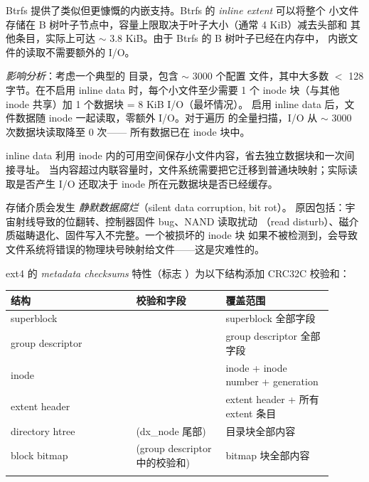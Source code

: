 \begin{filesystemlayout}
Btrfs 提供了类似但更慷慨的内嵌支持。Btrfs 的 \emph{inline extent} 可以将整个
小文件存储在 B 树叶子节点中，容量上限取决于叶子大小（通常 4 KiB）减去头部和
其他条目，实际上可达 $\sim$ 3.8 KiB。由于 Btrfs 的 B 树叶子已经在内存中，
内嵌文件的读取不需要额外的 I/O。

\emph{影响分析}：考虑一个典型的  目录，包含 $\sim$ 3000 个配置
文件，其中大多数 $<$ 128 字节。在不启用 inline data 时，每个小文件至少需要
1 个 inode 块（与其他 inode 共享）加 1 个数据块 = 8 KiB I/O（最坏情况）。
启用 inline data 后，文件数据随 inode 一起读取，零额外 I/O。对于遍历
 的全量扫描，I/O 从 $\sim$ 3000 次数据块读取降至 0 次——
所有数据已在 inode 块中。

inline data 利用 inode 内的可用空间保存小文件内容，省去独立数据块和一次间接寻址。
当内容超过内联容量时，文件系统需要把它迁移到普通块映射；实际读取是否产生 I/O
还取决于 inode 所在元数据块是否已经缓存。


存储介质会发生 \emph{静默数据腐烂}（silent data corruption, bit rot）。
原因包括：宇宙射线导致的位翻转、控制器固件 bug、NAND 读取扰动
（read disturb）、磁介质磁畴退化、固件写入不完整。一个被损坏的 inode 块
如果不被检测到，会导致文件系统将错误的物理块号映射给文件——这是灾难性的。

ext4 的 \emph{metadata checksums} 特性（标志
）为以下结构添加 CRC32C
校验和：

\begin{longtable}{|F{0.35\linewidth}|F{0.25\linewidth}|F{0.30\linewidth}|}
\toprule
{}
结构 & 校验和字段 & 覆盖范围 \\
\midrule
\endhead
\bottomrule
\endfoot
superblock &  & superblock 全部字段 \\\tablerowrule
group descriptor &  & group descriptor 全部字段 \\\tablerowrule
inode &  & inode + inode number + generation \\\tablerowrule
extent header &  & extent header + 所有 extent 条目 \\\tablerowrule
directory htree &  (dx\_node 尾部) & 目录块全部内容 \\\tablerowrule
block bitmap & (group descriptor 中的校验和) & bitmap 块全部内容 \\\tablerowrule
\end{longtable}


\end{filesystemlayout}
